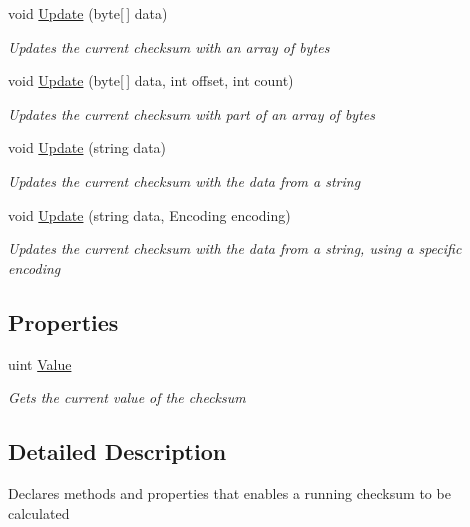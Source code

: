 \begin{DoxyCompactItemize}
void \hyperlink{interface_dot_z_lib_1_1_checksum_generator_a10930844922e72671843dd5c97709394}{Update} (byte\mbox{[}$\,$\mbox{]} data)
\begin{DoxyCompactList}\small\item\em Updates the current checksum with an array of bytes \end{DoxyCompactList}\item 
void \hyperlink{interface_dot_z_lib_1_1_checksum_generator_aeba84b3ca367362cb45f4a267354b53e}{Update} (byte\mbox{[}$\,$\mbox{]} data, int offset, int count)
\begin{DoxyCompactList}\small\item\em Updates the current checksum with part of an array of bytes \end{DoxyCompactList}\item 
void \hyperlink{interface_dot_z_lib_1_1_checksum_generator_ac5a728d2dd56479b429648177607fd39}{Update} (string data)
\begin{DoxyCompactList}\small\item\em Updates the current checksum with the data from a string \end{DoxyCompactList}\item 
void \hyperlink{interface_dot_z_lib_1_1_checksum_generator_ab894f35764ea30031c616517a6a00391}{Update} (string data, Encoding encoding)
\begin{DoxyCompactList}\small\item\em Updates the current checksum with the data from a string, using a specific encoding \end{DoxyCompactList}\end{DoxyCompactItemize}
\subsection*{Properties}
\begin{DoxyCompactItemize}
\item 
uint \hyperlink{interface_dot_z_lib_1_1_checksum_generator_a9da6eca33adb6bfe5dfc260797e07f49}{Value}
\begin{DoxyCompactList}\small\item\em Gets the current value of the checksum \end{DoxyCompactList}\end{DoxyCompactItemize}


\subsection{Detailed Description}
Declares methods and properties that enables a running checksum to be calculated 



